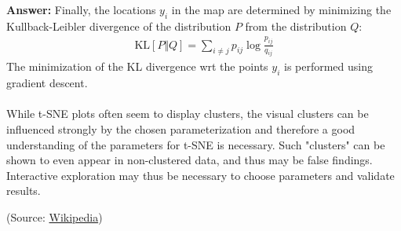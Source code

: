 \documentclass{article}
\newenvironment{QandA}{\begin{enumerate}[label=\arabic*.]}{\end{enumerate}}
\newenvironment{answer}{\par\normalfont \textbf{Answer:}}{}
\newcommand{\KL}[2]{\text{KL}\left[#1 \Vert #2 \right]}
\begin{document}
\begin{QandA}
\begin{answer}
    Finally, the locations $y_i$ in the map are determined by minimizing the Kullback-Leibler divergence of the distribution $P$ from the distribution $Q$:
    \begin{align*}
        \KL{P}{Q} = \sum_{i \neq j} p_{ij} \log \frac{p_{ij}}{q_{ij}}
    \end{align*}
    The minimization of the KL divergence wrt the points $y_i$ is performed using gradient descent.  \\\\
    While t-SNE plots often seem to display clusters, the visual clusters can be influenced strongly by the chosen parameterization and therefore a good understanding of the parameters for t-SNE is necessary. Such "clusters" can be shown to even appear in non-clustered data, and thus may be false findings. Interactive exploration may thus be necessary to choose parameters and validate results. 
    
    (Source: \href{https://en.wikipedia.org/wiki/T-distributed_stochastic_neighbor_embedding}{Wikipedia})
    \end{answer}
\end{QandA}
\end{document}
